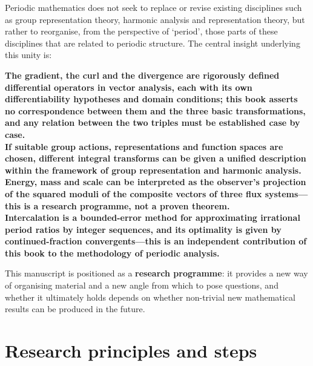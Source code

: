 Periodic mathematics does not seek to replace or revise existing disciplines such as group representation theory, harmonic analysis and representation theory, but rather to reorganise, from the perspective of `period', those parts of these disciplines that are related to periodic structure. The central insight underlying this unity is:
\begin{center}
\textbf{The gradient, the curl and the divergence are rigorously defined differential operators in vector analysis, each with its own differentiability hypotheses and domain conditions; this book asserts no correspondence between them and the three basic transformations, and any relation between the two triples must be established case by case.}\\
\textbf{If suitable group actions, representations and function spaces are chosen, different integral transforms can be given a unified description within the framework of group representation and harmonic analysis.}\\
\textbf{Energy, mass and scale can be interpreted as the observer's projection of the squared moduli of the composite vectors of three flux systems---this is a research programme, not a proven theorem.}\\
\textbf{Intercalation is a bounded-error method for approximating irrational period ratios by integer sequences, and its optimality is given by continued-fraction convergents---this is an independent contribution of this book to the methodology of periodic analysis.}
\end{center}

This manuscript is positioned as a \textbf{research programme}: it provides a new way of organising material and a new angle from which to pose questions, and whether it ultimately holds depends on whether non-trivial new mathematical results can be produced in the future.

\section*{Research principles and steps}


